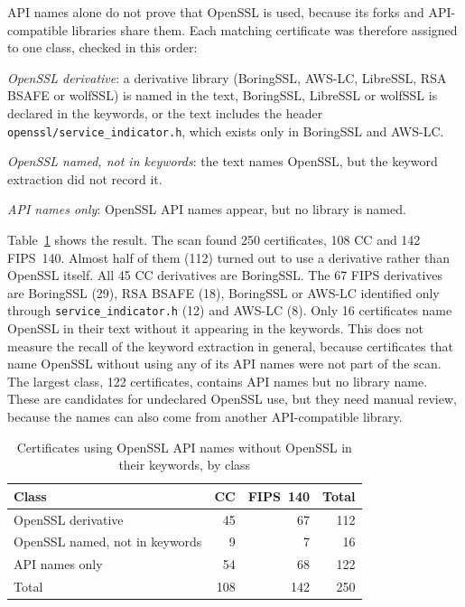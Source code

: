 API names alone do not prove that OpenSSL is used, because its forks and
API-compatible libraries share them. Each matching certificate was therefore
assigned to one class, checked in this order:
\begin{compactenum}
  \item \emph{OpenSSL derivative}: a derivative library (BoringSSL, AWS-LC,
    LibreSSL, RSA BSAFE or wolfSSL) is named in the text, BoringSSL, LibreSSL
    or wolfSSL is declared in the keywords, or the text includes the header
    \texttt{openssl/\allowbreak service\_indicator.h}, which exists only in
    BoringSSL and AWS-LC.
  \item \emph{OpenSSL named, not in keywords}: the text names OpenSSL, but the
    keyword extraction did not record it.
  \item \emph{API names only}: OpenSSL API names appear, but no library is
    named.
\end{compactenum}

Table~\ref{tab:api-detection} shows the result. The scan found 250
certificates, 108 CC and 142 FIPS~140. Almost half of them (112) turned out to
use a derivative rather than OpenSSL itself. All 45 CC derivatives are
BoringSSL. The 67 FIPS derivatives are BoringSSL (29), RSA BSAFE (18), BoringSSL
or AWS-LC identified only through \texttt{service\_indicator.h} (12) and AWS-LC
(8). Only 16 certificates name OpenSSL in their text without it appearing in the
keywords. This does not measure the recall of the keyword extraction in
general, because certificates that name OpenSSL without using any of its API
names were not part of the scan. The largest
class, 122 certificates, contains API names but no library name. These are
candidates for undeclared OpenSSL use, but they need manual review, because the
names can also come from another API-compatible library.

\begin{table}[htbp]
  \centering
  \caption{Certificates using OpenSSL API names without OpenSSL in their
    keywords, by class}
  \label{tab:api-detection}
  \begin{tabular}{lrrr}
    \toprule
    Class & CC & FIPS~140 & Total \\
    \midrule
    OpenSSL derivative             &  45 &  67 & 112 \\
    OpenSSL named, not in keywords &   9 &   7 &  16 \\
    API names only                 &  54 &  68 & 122 \\
    \midrule
    Total                          & 108 & 142 & 250 \\
    \bottomrule
  \end{tabular}
\end{table}

